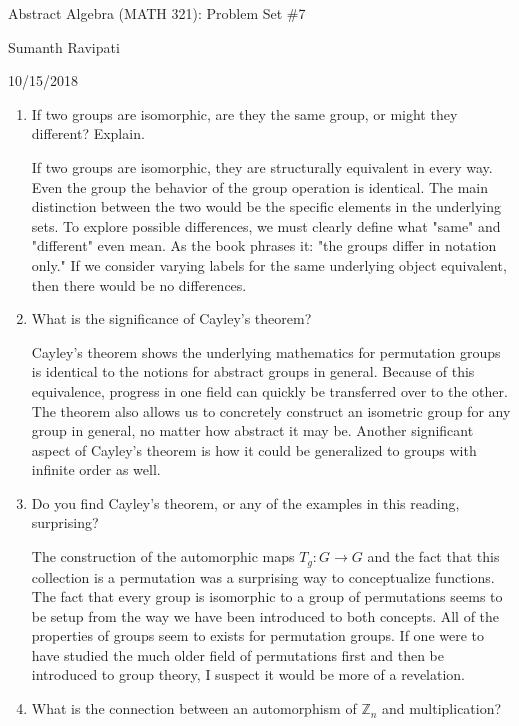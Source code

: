 \documentclass{article}
\newcommand{\Z}{\mathbb Z}
\begin{document}
%
\centerline{\Large Abstract Algebra (MATH 321): Problem Set \#7}
\centerline{Sumanth Ravipati}
\centerline{10/15/2018}

\begin{enumerate}
    \item If two groups are isomorphic, are they the same group, or might they different? Explain.
    \begin{flushleft}
    If two groups are isomorphic, they are structurally equivalent in every way. Even the group the behavior of the group operation is identical. The main distinction between the two would be the specific elements in the underlying sets. To explore possible differences, we must clearly define what "same" and "different" even mean. As the book phrases it: "the groups differ in notation only." If we consider varying labels for the same underlying object equivalent, then there would be no differences.
    \end{flushleft}
    \item What is the significance of Cayley’s theorem?
    \begin{flushleft}
    Cayley's theorem shows the underlying mathematics for permutation groups is identical to the notions for abstract groups in general. Because of this equivalence, progress in one field can quickly be transferred over to the other. The theorem also allows us to concretely construct an isometric group for any group in general, no matter how abstract it may be. Another significant aspect of Cayley's theorem is how it could be generalized to groups with infinite order as well.
    \end{flushleft}
    \item Do you find Cayley’s theorem, or any of the examples in this reading, surprising?
    \begin{flushleft}
    The construction of the automorphic maps $T_g: G \rightarrow G$ and the fact that this collection is a permutation was a surprising way to conceptualize functions. The fact that every group is isomorphic to a group of permutations seems to be setup from the way we have been introduced to both concepts. All of the properties of groups seem to exists for permutation groups. If one were to have studied the much older field of permutations first and then be introduced to group theory, I suspect it would be more of a revelation.
    \end{flushleft}
    \item What is the connection between an automorphism of $\Z_n$ and multiplication?
    \begin{flushleft}

\end{flushleft}
\end{enumerate}
\end{document}
